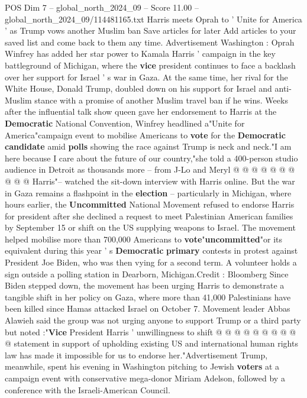 \begin{textsample}{POS Dim 7 – global\_north\_2024\_09 – Score 11.00 – global\_north\_2024\_09/114481165.txt}  \label{ex:f7_pos_079}
Harris meets Oprah to ' Unite for America ' as Trump vows another Muslim ban Save articles for later Add articles to your saved list and come back to them any time.
Advertisement Washington : Oprah Winfrey has added her star power to Kamala Harris ' campaign in the key battleground of Michigan, where the \textbf{vice} president continues to face a backlash over her support for Israel ' s war in Gaza.
At the same time, her rival for the White House, Donald Trump, doubled down on his support for Israel and anti-Muslim stance with a promise of another Muslim travel ban if he wins.
Weeks after the influential talk show queen gave her endorsement to Harris at the \textbf{Democratic} National Convention, Winfrey headlined a"Unite for America"campaign event to mobilise Americans to \textbf{vote} for the \textbf{Democratic} \textbf{candidate} amid \textbf{polls} showing the race against Trump is neck and neck."I am here because I care about the future of our country,"she told a 400-person studio audience in Detroit as thousands more -- from J-Lo and Meryl @ @ @ @ @ @ @ @ @ @ Harris"-- watched the sit-down interview with Harris online.
But the war in Gaza remains a flashpoint in the \textbf{election} -- particularly in Michigan, where hours earlier, the \textbf{Uncommitted} National Movement refused to endorse Harris for president after she declined a request to meet Palestinian American families by September 15 or shift on the US supplying weapons to Israel.
The movement helped mobilise more than 700,000 Americans to \textbf{vote}"\textbf{uncommitted}"or its equivalent during this year ' s \textbf{Democratic} \textbf{primary} contests in protest against President Joe Biden, who was then vying for a second term.
A volunteer holds a sign outside a polling station in Dearborn, Michigan.Credit : Bloomberg Since Biden stepped down, the movement has been urging Harris to demonstrate a tangible shift in her policy on Gaza, where more than 41,000 Palestinians have been killed since Hamas attacked Israel on October 7.
Movement leader Abbas Alawieh said the group was not urging anyone to support Trump or a third party but noted :"\textbf{Vice} President Harris ' unwillingness to shift @ @ @ @ @ @ @ @ @ @ statement in support of upholding existing US and international human rights law has made it impossible for us to endorse her."Advertisement Trump, meanwhile, spent his evening in Washington pitching to Jewish \textbf{voters} at a campaign event with conservative mega-donor Miriam Adelson, followed by a conference with the Israeli-American Council.

\end{textsample}
